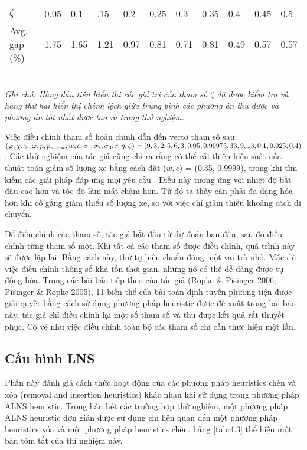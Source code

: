 
\begin{table}[caption={Tham số $\zeta$ và chất lượng giải pháp}, label=tab:4.2]
    \begin{tabular}{@{}lllllllllll@{}}
        \hline
        $\zeta$ & 0.05 & 0.1  & .15  & 0.2  & 0.25 & 0.3  & 0.35 & 0.4  & 0.45 & 0.5     \\
        Avg. gap (\%) & 1.75 & 1.65 & 1.21 & 0.97 & 0.81 & 0.71 & 0.81 & 0.49 & 0.57 & 0.57     \\ \bottomrule
        \end{tabular} \\
        \justify
        \textit{Ghi chú: Hàng đầu tiên hiển thị các giá trị của tham số $\zeta$ đã được kiểm tra và hàng thứ hai hiển thị chênh lệch giữa trung bình các phương án thu được và phương án tốt nhất được tạo ra trong thử nghiệm.}
    \label{tab:b1}
\end{table}


Việc điều chỉnh tham số hoàn chỉnh dẫn đến vectơ tham số sau:
$(\varphi, \chi, \psi, \omega, p,  p_{worst}, \\ w, c, \sigma_1, \sigma_2, \sigma_3, r, \eta, \zeta) = (9, 3, 2, 5, 6, 3, 0.05, 0.99975, 33, 9, 13, 0.1, 0.025, 0.4)$. Các thử nghiệm của tác giả cũng chỉ ra rằng có thể cải thiện hiệu suất của thuật toán giảm số lượng xe bằng cách đặt ($w,c$)  = (0.35, 0.9999), trong khi tìm kiếm các giải pháp đáp ứng mọi yêu cầu . Điều này tương ứng với nhiệt độ bắt đầu cao hơn và tốc độ làm mát chậm hơn. Từ đó ta thấy cần phải đa dạng hóa hơn khi cố gắng giảm thiểu số lượng xe, so với việc chỉ giảm thiểu khoảng cách di chuyển.

Để điều chỉnh các tham số, tác giả bắt đầu từ dự đoán ban đầu, sau đó điều chỉnh từng tham số một. Khi tất cả các tham số được điều chỉnh, quá trình này sẽ được lặp lại. Bằng cách này, thứ tự hiệu chuẩn đóng một vai trò nhỏ. Mặc dù việc điều chỉnh thông số khá tốn thời gian, nhưng nó có thể dễ dàng được tự động hóa. Trong các bài báo tiếp theo của tác giả (Ropke \& Pisinger 2006; Pisinger \& Ropke 2005), 11 biến thể của bài toán định tuyến phương tiện được giải quyết bằng cách sử dụng phương pháp heuristic được đề xuất trong bài báo này, tác giả chỉ điều chỉnh lại một số tham số và thu được kết quả rất thuyết phục. Có vẻ như việc điều chỉnh toàn bộ các tham số chỉ cần thực hiện một lần.

\subsection{Cấu hình LNS}
Phần này đánh giá cách thức hoạt động của các phương pháp heuristics chèn và xóa (removal and insertion heuristics) khác nhau khi sử dụng trong phương pháp ALNS heuristic. Trong hầu hết các trường hợp thử nghiệm, một phương pháp ALNS heuristic đơn giản được sử dụng chỉ liên quan đến một phương pháp heuristics xóa và một phương pháp heuristics chèn. bảng \ref{tab:4.3} thể hiện một bản tóm tắt của thí nghiệm này.

